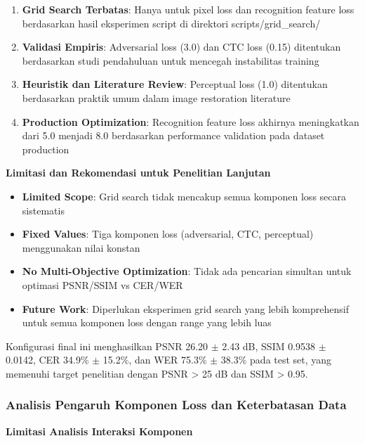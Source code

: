 \documentclass[12pt,a4paper]{article}
\begin{document}
\begin{enumerate}[leftmargin=*]
    \item \textbf{Grid Search Terbatas}: Hanya untuk pixel loss dan recognition feature loss berdasarkan hasil eksperimen script di direktori scripts/grid_search/
    \item \textbf{Validasi Empiris}: Adversarial loss (3.0) dan CTC loss (0.15) ditentukan berdasarkan studi pendahuluan untuk mencegah instabilitas training
    \item \textbf{Heuristik dan Literature Review}: Perceptual loss (1.0) ditentukan berdasarkan praktik umum dalam image restoration literature
    \item \textbf{Production Optimization}: Recognition feature loss akhirnya meningkatkan dari 5.0 menjadi 8.0 berdasarkan performance validation pada dataset production
\end{enumerate}

\textbf{Limitasi dan Rekomendasi untuk Penelitian Lanjutan}

\begin{itemize}[leftmargin=*]
    \item \textbf{Limited Scope}: Grid search tidak mencakup semua komponen loss secara sistematis
    \item \textbf{Fixed Values}: Tiga komponen loss (adversarial, CTC, perceptual) menggunakan nilai konstan
    \item \textbf{No Multi-Objective Optimization}: Tidak ada pencarian simultan untuk optimasi PSNR/SSIM vs CER/WER
    \item \textbf{Future Work}: Diperlukan eksperimen grid search yang lebih komprehensif untuk semua komponen loss dengan range yang lebih luas
\end{itemize}

Konfigurasi final ini menghasilkan PSNR 26.20 $\pm$ 2.43 dB, SSIM 0.9538 $\pm$ 0.0142, CER 34.9\% $\pm$ 15.2\%, dan WER 75.3\% $\pm$ 38.3\% pada test set, yang memenuhi target penelitian dengan PSNR > 25 dB dan SSIM > 0.95.

\vspace{0.8em}

\subsubsection{Analisis Pengaruh Komponen Loss dan Keterbatasan Data}
\label{subsubsec:interaksi-komponen}

\textbf{Limitasi Analisis Interaksi Komponen}
\end{document}
